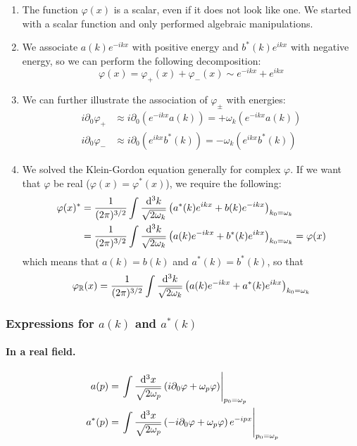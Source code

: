 \begin{enumerate}
\item The function $\varphi(x)$ is a scalar, even if it does not look like one. We started with a scalar function and only performed algebraic manipulations.
\item We associate $a(k)e^{-ikx}$ with positive energy and $b^*(k)e^{ikx}$ with negative energy, so we can perform the following decomposition:
\[ \varphi(x) = \varphi_+(x) + \varphi_-(x) \sim e^{-ikx} + e^{ikx} \]
\item We can further illustrate the association of $\varphi_\pm$ with energies:
\begin{align*}
i\partial_0\varphi_+ &\approx i\partial_0(e^{-ikx}a(k)) = +\omega_k(e^{-ikx}a(k)) \\
i\partial_0\varphi_- &\approx i\partial_0(e^{ikx}b^*(k)) = -\omega_k(e^{ikx}b^*(k))
\end{align*}
\item We solved the Klein-Gordon equation generally for complex $\varphi$. If we want that $\varphi$ be real ($\varphi(x) = \varphi^*(x)$), we require the following:
\begin{align*}
\varphi(x)^* &= \frac{1}{(2\pi)^{3/2}} \int \frac{\operatorname{d \!}{^{3}k}}{\sqrt{2\omega_k}}\left(a^*(k)e^{ikx} + b(k)e^{-ikx}\right)_{k_0 = \omega_k} \\
&= \frac{1}{(2\pi)^{3/2}} \int \frac{\operatorname{d \!}{^{3}k}}{\sqrt{2\omega_k}}\left(a(k)e^{-ikx} + b^*(k)e^{ikx}\right)_{k_0 = \omega_k} = \varphi(x)
\end{align*}
which means that $a(k) = b(k)$ and $a^*(k) = b^*(k)$, so that
\[\varphi_{\mathbb{R}}(x) = \frac{1}{(2\pi)^{3/2}} \int \frac{\operatorname{d \!}{^{3}k}}{\sqrt{2\omega_k}}\left(a(k)e^{-ikx} + a^*(k)e^{ikx}\right)_{k_0 = \omega_k}\]
\end{enumerate}

\subsubsection{Expressions for $a(k)$ and $a^*(k)$}
\paragraph{In a real field.}
\begin{align*}
a(p) &= \left.\int \frac{\operatorname{d \!}{^3x}}{\sqrt{2\omega_p}}\left(i\partial_0\varphi + \omega_p\varphi\right)\right|_{p_0 = \omega_p} \\
a^*(p) &= \left.\int \frac{\operatorname{d \!}{^3x}}{\sqrt{2\omega_p}}\left(-i\partial_0\varphi + \omega_p\varphi\right)e^{-ipx}\right|_{p_0 = \omega_p}
\end{align*}
